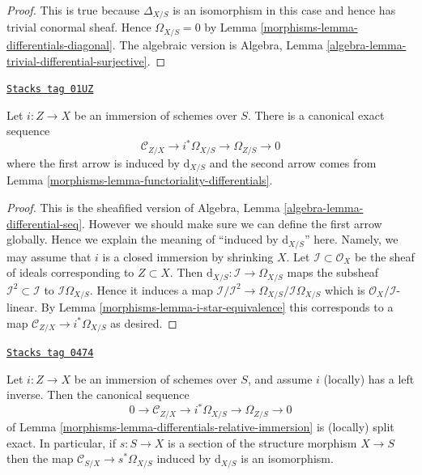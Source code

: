 \begin{proof}

This is true because $\Delta_{X/S}$ is an isomorphism in this case
and hence has trivial conormal sheaf. Hence $\Omega_{X/S} = 0$
by Lemma \ref{morphisms-lemma-differentials-diagonal}. The algebraic version is
Algebra, Lemma \ref{algebra-lemma-trivial-differential-surjective}.
\end{proof}

\begin{lemma}
\label{morphisms-lemma-differentials-relative-immersion}
\href{https://stacks.math.columbia.edu/tag/01UZ}{\texttt{Stacks tag 01UZ}}

Let $i : Z \to X$ be an immersion of schemes over $S$.
There is a canonical exact sequence
$$
\mathcal{C}_{Z/X} \to i^*\Omega_{X/S} \to \Omega_{Z/S} \to 0
$$
where the first arrow is induced by $\text{d}_{X/S}$
and the second arrow comes from Lemma \ref{morphisms-lemma-functoriality-differentials}.
\end{lemma}

\begin{proof}

This is the sheafified version of
Algebra, Lemma \ref{algebra-lemma-differential-seq}. However
we should make sure we can define the first arrow globally.
Hence we explain the meaning of ``induced by $\text{d}_{X/S}$'' here.
Namely, we may assume that $i$ is a closed immersion by
shrinking $X$. Let $\mathcal{I} \subset \mathcal{O}_X$
be the sheaf of ideals corresponding to $Z \subset X$.
Then $\text{d}_{X/S} : \mathcal{I} \to \Omega_{X/S}$
maps the subsheaf $\mathcal{I}^2 \subset \mathcal{I}$ to
$\mathcal{I}\Omega_{X/S}$. Hence it induces a map
$\mathcal{I}/\mathcal{I}^2 \to \Omega_{X/S}/\mathcal{I}\Omega_{X/S}$
which is $\mathcal{O}_X/\mathcal{I}$-linear.
By Lemma \ref{morphisms-lemma-i-star-equivalence} this corresponds to a map
$\mathcal{C}_{Z/X} \to i^*\Omega_{X/S}$ as desired.
\end{proof}

\begin{lemma}
\label{morphisms-lemma-differentials-relative-immersion-section}
\href{https://stacks.math.columbia.edu/tag/0474}{\texttt{Stacks tag 0474}}

Let $i : Z \to X$ be an immersion of schemes over $S$, and
assume $i$ (locally) has a left inverse. Then the canonical
sequence
$$
0 \to \mathcal{C}_{Z/X} \to i^*\Omega_{X/S} \to \Omega_{Z/S} \to 0
$$
of
Lemma \ref{morphisms-lemma-differentials-relative-immersion}
is (locally) split exact. In particular, if $s : S \to X$ is a section
of the structure morphism $X \to S$ then the map
$\mathcal{C}_{S/X} \to s^*\Omega_{X/S}$ induced by
$\text{d}_{X/S}$ is an isomorphism.
\end{lemma}

